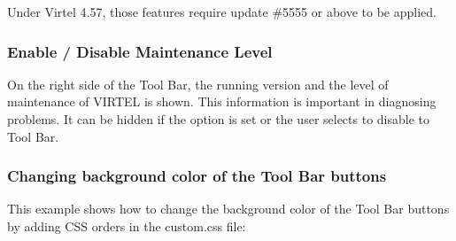 \documentclass[letterpaper,10pt,english]{sphinxmanual}
\begin{document}
Under Virtel 4.57, those features require update \#5555 or above to be applied.

\ignorespaces 

\subsubsection{Enable / Disable Maintenance Level}
\label{\detokenize{Customization:enable-disable-maintenance-level}}\label{\detokenize{Customization:index-21}}
On the right side of the Tool Bar, the running version and the level of maintenance of VIRTEL is shown. This information is important in diagnosing problems. It can be hidden if the  option is set or the user selects to disable to Tool Bar.


\subsubsection{Changing background color of the Tool Bar buttons}
\label{\detokenize{Customization:changing-background-color-of-the-tool-bar-buttons}}
This example shows how to change the background color of the Tool Bar buttons by adding CSS orders in the custom.css file:
\end{document}
